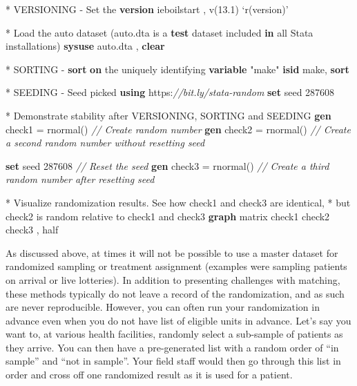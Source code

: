 \documentclass[
]{book}
\newenvironment{Shaded}{\begin{snugshade}}{\end{snugshade}}
\newcommand{\CommentTok}[1]{\textcolor[rgb]{0.56,0.35,0.01}{\textit{#1}}}
\newcommand{\DecValTok}[1]{\textcolor[rgb]{0.00,0.00,0.81}{#1}}
\newcommand{\FunctionTok}[1]{\textcolor[rgb]{0.00,0.00,0.00}{#1}}
\newcommand{\KeywordTok}[1]{\textcolor[rgb]{0.13,0.29,0.53}{\textbf{#1}}}
\newcommand{\NormalTok}[1]{#1}
\newcommand{\OtherTok}[1]{\textcolor[rgb]{0.56,0.35,0.01}{#1}}
\newcommand{\StringTok}[1]{\textcolor[rgb]{0.31,0.60,0.02}{#1}}
\begin{document}
\begin{Shaded}
\begin{Highlighting}[numbers=left,,]
\NormalTok{* VERSIONING - Set the }\KeywordTok{version}
\NormalTok{    ieboilstart , v(13.1)}
    \OtherTok{`r(version)'}

\NormalTok{* Load the auto dataset (auto.dta is a }\KeywordTok{test}\NormalTok{ dataset included }\KeywordTok{in} \OtherTok{all}\NormalTok{ Stata installations)}
    \KeywordTok{sysuse}\NormalTok{ auto.dta , }\KeywordTok{clear}

\NormalTok{* SORTING - }\KeywordTok{sort} \KeywordTok{on}\NormalTok{ the uniquely identifying }\KeywordTok{variable} \StringTok{"make"}
    \KeywordTok{isid}\NormalTok{ make, }\KeywordTok{sort}

\NormalTok{* SEEDING - Seed picked }\KeywordTok{using}\NormalTok{ https:}\CommentTok{//bit.ly/stata-random}
    \KeywordTok{set} \DecValTok{seed}\NormalTok{ 287608}

\NormalTok{* Demonstrate stability after VERSIONING, SORTING and SEEDING}
    \KeywordTok{gen}\NormalTok{ check1 = rnormal()  }\CommentTok{// Create random number}
    \KeywordTok{gen}\NormalTok{ check2 = rnormal()  }\CommentTok{// Create a second random number without resetting seed}

    \KeywordTok{set} \DecValTok{seed}\NormalTok{ 287608         }\CommentTok{// Reset the seed}
    \KeywordTok{gen}\NormalTok{ check3 = rnormal()  }\CommentTok{// Create a third random number after resetting seed}

\NormalTok{* Visualize randomization results. See how check1 and check3 are identical,}
\NormalTok{* but check2 is random relative to check1 and check3}
    \KeywordTok{graph} \FunctionTok{matrix}\NormalTok{ check1 check2 check3 , half}
\end{Highlighting}
\end{Shaded}

As discussed above, at times it will not be possible to use a master dataset for
randomized sampling or treatment assignment
(examples were sampling patients on arrival or live lotteries).
In addition to presenting challenges with matching,
these methods typically do not leave a record of the randomization,
and as such are never reproducible.
However, you can often run your randomization in advance
even when you do not have list of eligible units in advance.
Let's say you want to, at various health facilities,
randomly select a sub-sample of patients as they arrive.
You can then have a pre-generated list
with a random order of ``in sample'' and ``not in sample''.
Your field staff would then go through this list in order
and cross off one randomized result as it is used for a patient.
\end{document}
